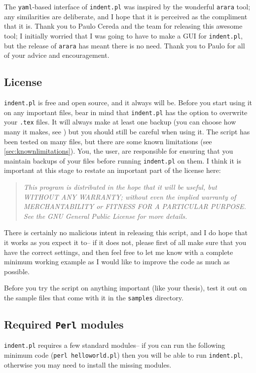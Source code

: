  	The \lstinline!yaml!-based interface of \lstinline!indent.pl! was inspired 
 	by the wonderful \lstinline!arara! tool; any similarities are deliberate, and 
 	I hope that it is perceived as the compliment that it is. Thank you to Paulo Cereda and the 
 	team for releasing this awesome tool; I initially worried that I was going to 
 	have to make a GUI for \lstinline!indent.pl!, but the release of \lstinline!arara! 
 	has meant there is no need. Thank you to Paulo for all of your advice and 
 	encouragement.
 	 	
 \subsection{License}
 	\lstinline!indent.pl! is free and open source, and it always will be.
 	Before you start using it on any important files, bear in mind that \lstinline!indent.pl! has the option to overwrite your \lstinline!.tex! files.
 	It will always make at least one backup (you can choose how many it makes, see )
 	but you should still be careful when using it. The script has been tested on many
 	files, but there are some known limitations (see \cref{sec:knownlimitations}). 
 	You, the user, are responsible for ensuring that you maintain backups of your files
 	before running \lstinline!indent.pl! on them. I think it is important at this
 	stage to restate an important part of the license here:
 	\begin{quote}\itshape
 		This program is distributed in the hope that it will be useful,
 		but WITHOUT ANY WARRANTY; without even the implied warranty of
 		MERCHANTABILITY or FITNESS FOR A PARTICULAR PURPOSE.  See the
 		GNU General Public License for more details.
 	\end{quote}
 	There is certainly no malicious intent in releasing this script, and I do hope
 	that it works as you expect it to-- if it does not, please first of all 
 	make sure that you have the correct settings, and then feel free to let me know with a 
 	complete minimum working example as I would like to improve the code as much as possible. 
 	 	
 	\begin{warning}
 		Before you try the script on anything important (like your thesis), test it 
 		out on the sample files that come with it in the \lstinline!samples! directory. 
 	\end{warning}
 	 	
 \subsection{Required \lstinline!Perl! modules}
 	\lstinline!indent.pl! requires a few standard modules-- if you can run the following
 	minimum code (\lstinline!perl helloworld.pl!) then you will be able to run \lstinline!indent.pl!, otherwise you may 
 	need to install the missing modules.
 	 	
